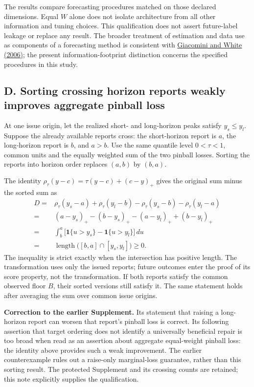 The results compare forecasting procedures matched on those declared
dimensions. Equal \(W\) alone does not isolate architecture from all other
information and tuning choices. This qualification does not assert future-label
leakage or replace any result. The broader treatment of estimation and data
use as components of a forecasting method is consistent with
\href{https://doi.org/10.1111/j.1468-0262.2006.00718.x}{Giacomini and White
(2006)}; the present information-footprint distinction concerns the specified
procedures in this study.

\subsection*{D. Sorting crossing horizon reports weakly improves aggregate pinball loss}

At one issue origin, let the realized short- and long-horizon peaks satisfy
\(y_s\le y_l\). Suppose the already available reports cross: the short-horizon
report is \(a\), the long-horizon report is \(b\), and \(a>b\). Use the same
quantile level \(0<\tau<1\), common units and the equally weighted sum of the
two pinball losses. Sorting the reports into horizon order replaces
\((a,b)\) by \((b,a)\).

The identity \(\rho_\tau(y-c)=\tau(y-c)+(c-y)_+\) gives the original sum
minus the sorted sum as
\[
\begin{aligned}
D={}&\rho_\tau(y_s-a)+\rho_\tau(y_l-b)
      -\rho_\tau(y_s-b)-\rho_\tau(y_l-a)\\
 ={}&(a-y_s)_+-(b-y_s)_+-(a-y_l)_++(b-y_l)_+\\
 ={}&\int_b^a\bigl[\mathbf1\{u>y_s\}-\mathbf1\{u>y_l\}\bigr]\,du\\
 ={}&\operatorname{length}\bigl([b,a]\cap[y_s,y_l]\bigr)\ge0.
\end{aligned}
\]
The inequality is strict exactly when the intersection has positive length.
The transformation uses only the issued reports; future outcomes enter the
proof of its score property, not the transformation. If both reports satisfy
the common observed floor \(B\), their sorted versions still satisfy it.
The same statement holds after averaging the sum over common issue origins.

\textbf{Correction to the earlier Supplement.} Its statement that raising a
long-horizon report can worsen that report's pinball loss is correct. Its
following assertion that target ordering does not identify a universally
beneficial repair is too broad when read as an assertion about aggregate
equal-weight pinball loss: the identity above provides such a weak improvement.
The earlier counterexample rules out a raise-only marginal-loss guarantee,
rather than this sorting result. The protected Supplement and its crossing
counts are retained; this note explicitly supplies the qualification.

